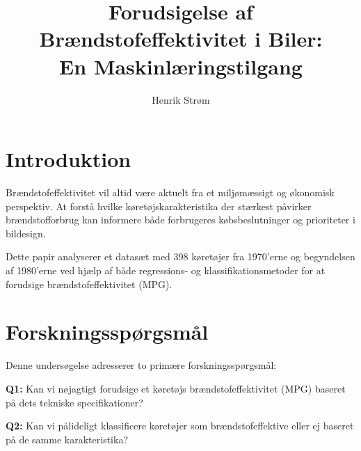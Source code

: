 \documentclass[a4paper, twocolumn]{article}
\author{Henrik Strøm}
\title{Forudsigelse af Brændstofeffektivitet i Biler:\\En Maskinlæringstilgang}
\begin{document}

\section{Introduktion}
\label{sec:intro}

Brændstofeffektivitet vil altid være aktuelt fra et miljømæssigt og økonomisk perspektiv. At forstå hvilke køretøjskarakteristika der stærkest påvirker brændstofforbrug kan informere både forbrugeres købsbeslutninger og prioriteter i bildesign.
 
Dette papir analyserer et datasæt med 398 køretøjer fra 1970'erne og begyndelsen af 1980'erne ved hjælp af både regressions- og klassifikationsmetoder for at forudsige brændstofeffektivitet (MPG).

\section{Forskningsspørgsmål}
\label{sec:research}

Denne undersøgelse adresserer to primære forskningsspørgsmål:

\textbf{Q1:} Kan vi nøjagtigt forudsige et køretøjs brændstofeffektivitet (MPG) baseret på dets tekniske specifikationer?

\textbf{Q2:} Kan vi pålideligt klassificere køretøjer som brændstofeffektive eller ej baseret på de samme karakteristika?
\end{document}
